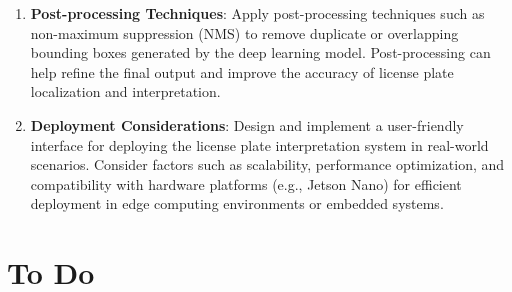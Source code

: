\begin{enumerate}[label=\arabic*.]
		\item \textbf{Post-processing Techniques}: Apply post-processing techniques such as non-maximum suppression (NMS) to remove duplicate or overlapping bounding boxes generated by the deep learning model. Post-processing can help refine the final output and improve the accuracy of license plate localization and interpretation.
		
		\item \textbf{Deployment Considerations}: Design and implement a user-friendly interface for deploying the license plate interpretation system in real-world scenarios. Consider factors such as scalability, performance optimization, and compatibility with hardware platforms (e.g., Jetson Nano) for efficient deployment in edge computing environments or embedded systems.
	\end{enumerate}
	
\section{To Do}



